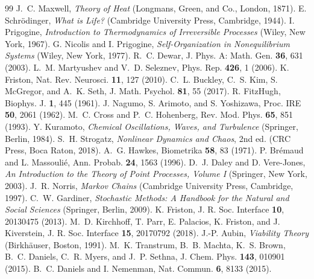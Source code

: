 \documentclass[11pt]{article}
\begin{document}
\begin{thebibliography}{99}
 J.~C. Maxwell, \textit{Theory of Heat} (Longmans, Green, and Co., London, 1871).
 E. Schr{\"o}dinger, \textit{What is Life?} (Cambridge University Press, Cambridge, 1944).
 I. Prigogine, \textit{Introduction to Thermodynamics of Irreversible Processes} (Wiley, New York, 1967).
 G. Nicolis and I. Prigogine, \textit{Self-Organization in Nonequilibrium Systems} (Wiley, New York, 1977).
 R.~C. Dewar, J. Phys. A: Math. Gen. \textbf{36}, 631 (2003).
 L.~M. Martyushev and V.~D. Seleznev, Phys. Rep. \textbf{426}, 1 (2006).
 K. Friston, Nat. Rev. Neurosci. \textbf{11}, 127 (2010).
 C.~L. Buckley, C.~S. Kim, S. McGregor, and A.~K. Seth, J. Math. Psychol. \textbf{81}, 55 (2017).
 R. FitzHugh, Biophys. J. \textbf{1}, 445 (1961).
 J. Nagumo, S. Arimoto, and S. Yoshizawa, Proc. IRE \textbf{50}, 2061 (1962).
 M.~C. Cross and P.~C. Hohenberg, Rev. Mod. Phys. \textbf{65}, 851 (1993).
 Y. Kuramoto, \textit{Chemical Oscillations, Waves, and Turbulence} (Springer, Berlin, 1984).
 S.~H. Strogatz, \textit{Nonlinear Dynamics and Chaos}, 2nd ed. (CRC Press, Boca Raton, 2018).
 A.~G. Hawkes, Biometrika \textbf{58}, 83 (1971).
 P. Br{\'e}maud and L. Massouli{\'e}, Ann. Probab. \textbf{24}, 1563 (1996).
 D.~J. Daley and D. Vere-Jones, \textit{An Introduction to the Theory of Point Processes, Volume I} (Springer, New York, 2003).
 J.~R. Norris, \textit{Markov Chains} (Cambridge University Press, Cambridge, 1997).
 C.~W. Gardiner, \textit{Stochastic Methods: A Handbook for the Natural and Social Sciences} (Springer, Berlin, 2009).
 K. Friston, J. R. Soc. Interface \textbf{10}, 20130475 (2013).
 M.~D. Kirchhoff, T. Parr, E. Palacios, K. Friston, and J. Kiverstein, J. R. Soc. Interface \textbf{15}, 20170792 (2018).
 J.-P. Aubin, \textit{Viability Theory} (Birkh{\"a}user, Boston, 1991).
 M.~K. Transtrum, B.~B. Machta, K.~S. Brown, B.~C. Daniels, C.~R. Myers, and J.~P. Sethna, J. Chem. Phys. \textbf{143}, 010901 (2015).
 B.~C. Daniels and I. Nemenman, Nat. Commun. \textbf{6}, 8133 (2015).
\end{thebibliography}
\end{document}
